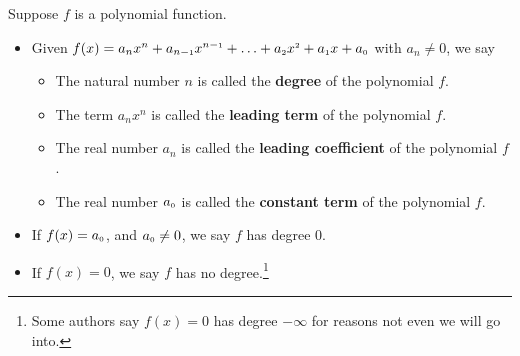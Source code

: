 \colorbox{ResultColor}{\bbm

\begin{defn}  Suppose $f$ is a polynomial function. \label{degreeandallthat}

\begin{itemize}

\item Given $f(x) = a_{n} x^{n} + a_{n-\mbox{\tiny$1$}} x^{n-\mbox{\tiny$1$}} + \ldots + a_{\mbox{\tiny $2$}} x^{\mbox{\tiny $2$}} + a_{\mbox{\tiny $1$}} x + a_{\mbox{\tiny $0$}}$ with $a_{n} \neq 0$, we say 

\begin{itemize}

\item  The natural number $n$ is called the \textbf{degree} of the polynomial $f$.

\item  The term $a_{n} x^{n}$ is called the \textbf{leading term} of the polynomial $f$.

\item  The real number $a_{n}$ is called the \textbf{leading coefficient} of the polynomial $f$.

\item  The real number $a_{\mbox{\tiny $0$}}$ is called the \textbf{constant term} of the polynomial $f$.

\end{itemize}

\item  If $f(x) = a_{\mbox{\tiny $0$}}$, and $a_{\mbox{\tiny $0$}} \neq 0$, we say $f$ has degree $0$.

\item  If $f(x) = 0$, we say $f$ has no degree.\footnote{Some authors say $f(x) = 0$ has degree $-\infty$ for reasons not even we will go into.}

\end{itemize}

\end{defn}

\ebm}

\smallskip

